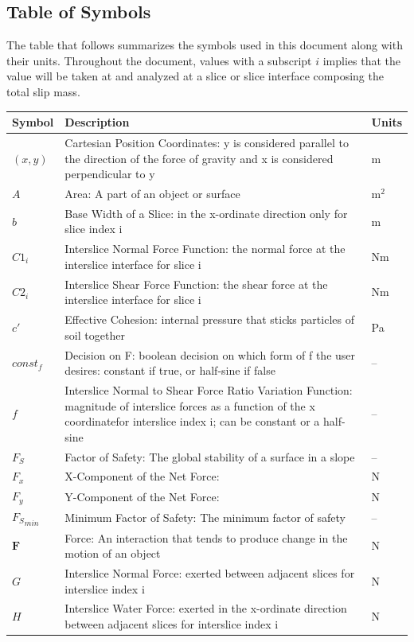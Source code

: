 \documentclass[12pt]{article}
\begin{document}
\subsection{Table of Symbols}
\label{Sec:ToS}
The table that follows summarizes the symbols used in this document along with their units. Throughout the document, values with a subscript $i$ implies that the value will be taken at and analyzed at a slice or slice interface composing the total slip mass.
\begin{longtabu}{l X[l] l}
\toprule
Symbol & Description & Units
\\
\midrule
$(x,y)$ & Cartesian Position Coordinates: y is considered parallel to the direction of the force of gravity and x is considered perpendicular to y & m
\\
$A$ & Area: A part of an object or surface & $\text{m}^{2}$
\\
$b$ & Base Width of a Slice: in the x-ordinate direction only for slice index i & m
\\
${C1_{i}}$ & Interslice Normal Force Function: the normal force at the interslice interface for slice i & Nm
\\
${C2_{i}}$ & Interslice Shear Force Function: the shear force at the interslice interface for slice i & Nm
\\
$c'$ & Effective Cohesion: internal pressure that sticks particles of soil together & Pa
\\
$const_f$ & Decision on F: boolean decision on which form of f the user desires: constant if true, or half-sine if false & --
\\
$f$ & Interslice Normal to Shear Force Ratio Variation Function: magnitude of interslice forces as a function of the x coordinatefor interslice index i; can be constant or a half-sine & --
\\
${F_{S}}$ & Factor of Safety: The global stability of a surface in a slope & --
\\
${F_{x}}$ & X-Component of the Net Force:  & N
\\
${F_{y}}$ & Y-Component of the Net Force:  & N
\\
${{F_{S}}_{min}}$ & Minimum Factor of Safety: The minimum factor of safety & --
\\
$\mathbf{F}$ & Force: An interaction that tends to produce change in the motion of an object & N
\\
$G$ & Interslice Normal Force: exerted between adjacent slices for interslice index i & N
\\
$H$ & Interslice Water Force: exerted in the x-ordinate direction between adjacent slices for interslice index i & N

\end{longtabu}
\end{document}
